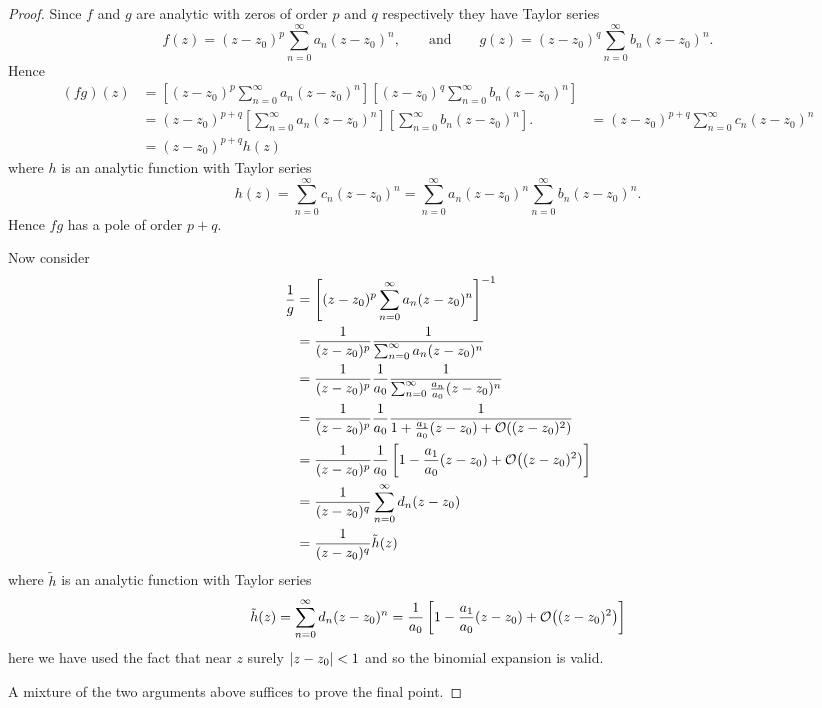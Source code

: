 \documentclass{article}
\begin{document}
    \begin{proof}
        Since \(f\) and \(g\) are analytic with zeros of order \(p\) and \(q\) respectively they have Taylor series
        \[f(z) = (z - z_0)^{p}\sum_{n=0}^{\infty} a_n(z - z_0)^n, \qquad\text{and}\qquad g(z) = (z - z_0)^q\sum_{n=0}^{\infty} b_n(z - z_0)^n.\]
        Hence
        \begin{align*}
            (fg)(z) &= \left[ (z - z_0)^{p}\sum_{n=0}^{\infty} a_n(z - z_0)^n \right] \left[ (z - z_0)^q\sum_{n=0}^{\infty} b_n(z - z_0)^n \right]\\
            &= (z - z_0)^{p+q} \left[ \sum_{n=0}^{\infty} a_n(z - z_0)^n \right] \left[ \sum_{n=0}^{\infty} b_n(z - z_0)^n \right].
            &= (z - z_0)^{p + q} \sum_{n=0}^{\infty} c_n(z - z_0)^n\\
            &= (z - z_0)^{p + q}h(z)
        \end{align*}
        where \(h\) is an analytic function with Taylor series
        \[h(z) = \sum_{n=0}^{\infty} c_n(z - z_0)^n = \sum_{n=0}^{\infty} a_n(z - z_0)^n \sum_{n=0}^{\infty} b_n(z - z_0)^n.\]
        Hence \(fg\) has a pole of order \(p + q\).
        
        Now consider
        \begin{align*}
            \frac{1}{g} &= \left[ (z - z_0)^p\sum_{n=0}^{\infty} a_n(z - z_0)^n \right]^{-1}\\
            &= \frac{1}{(z - z_0)^p} \frac{1}{\sum_{n=0}^{\infty} a_n(z - z_0)^n}\\
            &= \frac{1}{(z - z_0)^p} \frac{1}{a_0} \frac{1}{\sum_{n=0}^{\infty} \frac{a_n}{a_0}(z - z_0)^n}\\
            &= \frac{1}{(z - z_0)^p} \frac{1}{a_0} \frac{1}{1 + \frac{a_1}{a_0}(z - z_0) + \order{(z - z_0)^2}}\\
            &= \frac{1}{(z - z_0)^p} \frac{1}{a_0} \left[ 1 - \frac{a_1}{a_0}(z - z_0) + \order{(z - z_0)^2} \right]\\
            &= \frac{1}{(z - z_0)^q} \sum_{n=0}^{\infty} d_n(z - z_0)\\
            &= \frac{1}{(z - z_0)^q} \tilde{h}(z)
        \end{align*}
        where \(\tilde{h}\) is an analytic function with Taylor series
        \[\tilde{h}(z) = \sum_{n=0}^{\infty} d_n(z - z_0)^n = \frac{1}{a_0} \left[ 1 - \frac{a_1}{a_0}(z - z_0) + \order{(z - z_0)^2} \right]\]
        here we have used the fact that near \(z\) surely \(\abs{z - z_0} < 1\) and so the binomial expansion is valid.
        
        A mixture of the two arguments above suffices to prove the final point.
    \end{proof}
\end{document}
